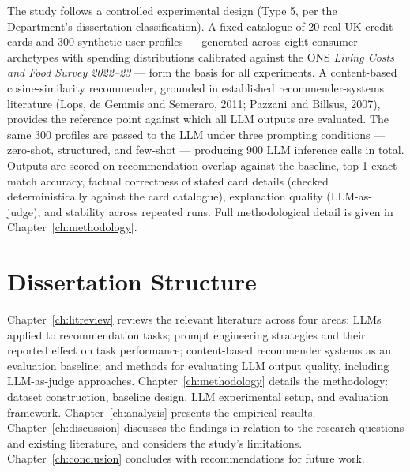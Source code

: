 The study follows a controlled experimental design (Type 5, per the Department's dissertation classification). A fixed catalogue of 20 real UK credit cards and 300 synthetic user profiles --- generated across eight consumer archetypes with spending distributions calibrated against the ONS \textit{Living Costs and Food Survey 2022--23} --- form the basis for all experiments. A content-based cosine-similarity recommender, grounded in established recommender-systems literature (Lops, de Gemmis and Semeraro, 2011; Pazzani and Billsus, 2007), provides the reference point against which all LLM outputs are evaluated. The same 300 profiles are passed to the LLM under three prompting conditions --- zero-shot, structured, and few-shot --- producing 900 LLM inference calls in total. Outputs are scored on recommendation overlap against the baseline, top-1 exact-match accuracy, factual correctness of stated card details (checked deterministically against the card catalogue), explanation quality (LLM-as-judge), and stability across repeated runs. Full methodological detail is given in Chapter~\ref{ch:methodology}.

\section{Dissertation Structure}

Chapter~\ref{ch:litreview} reviews the relevant literature across four areas: LLMs applied to recommendation tasks; prompt engineering strategies and their reported effect on task performance; content-based recommender systems as an evaluation baseline; and methods for evaluating LLM output quality, including LLM-as-judge approaches. Chapter~\ref{ch:methodology} details the methodology: dataset construction, baseline design, LLM experimental setup, and evaluation framework. Chapter~\ref{ch:analysis} presents the empirical results. Chapter~\ref{ch:discussion} discusses the findings in relation to the research questions and existing literature, and considers the study's limitations. Chapter~\ref{ch:conclusion} concludes with recommendations for future work.
